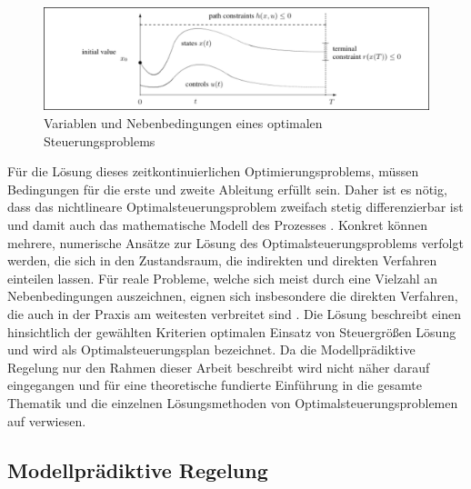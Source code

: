 \begin{figure}
\centering
\includegraphics[width=\textwidth]{abbildungen/20160327_mpc}
\caption[Variablen und Nebenbedingungen eines optimalen Steuerungsproblems]{Variablen und Nebenbedingungen eines optimalen Steuerungsproblems \cite[S.61]{di14}}
\label{fig:opt}
\end{figure}

Für die Lösung dieses zeitkontinuierlichen Optimierungsproblems, müssen Bedingungen für die erste und zweite Ableitung erfüllt sein. Daher ist es nötig, dass das nichtlineare Optimalsteuerungsproblem zweifach stetig differenzierbar ist und damit auch das mathematische Modell des Prozesses \cite[S.~21ff.]{di14}.
Konkret können mehrere, numerische Ansätze zur Lösung des Optimalsteuerungsproblems verfolgt werden, die sich in den Zustandsraum, die indirekten und direkten Verfahren einteilen lassen. Für reale Probleme, welche sich meist durch eine Vielzahl an Nebenbedingungen auszeichnen, eignen sich insbesondere die direkten Verfahren, die auch in der Praxis am weitesten verbreitet sind \cite[S.~63]{di14}. Die Lösung beschreibt einen hinsichtlich der gewählten Kriterien optimalen Einsatz von Steuergrößen Lösung und wird als Optimalsteuerungsplan bezeichnet.
Da die Modellprädiktive Regelung nur den Rahmen dieser Arbeit beschreibt wird nicht näher darauf eingegangen und für eine theoretische fundierte Einführung in die gesamte Thematik und die einzelnen Lösungsmethoden von Optimalsteuerungsproblemen auf \cite{di14} verwiesen.

\subsection{Modellprädiktive Regelung}

